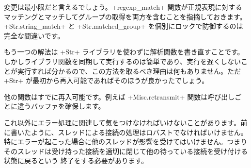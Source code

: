 変更は最小限だと言えるでしょう。\ml+regexp_match+ 関数が正規表現に対するマッチングとマッチしてグループの取得を両方を含むことを指摘しておきます。\ml+Str.string_match+ と \ml+Str.matched_group+ を個別にロックで防御するのは完全な間違いです。

もう一つの解法は \ml+Str+ ライブラリを使わずに解析関数を書き直すことです。しかしライブラリ関数を同期して実行するのは簡単であり、実行を遅くしないことが実行すれば分かるので、この方法を取るべき理由は何もありません。ただ \ml+Str+ が最初から再入可能であればそのほうが良かったでしょう。

他の関数はすでに再入可能です。例えば \ml+Misc.retransmit+ 関数は呼び出しごとに違うバッファを確保します。

これ以外にエラー処理に関連して気をつけなければいけないことがあります。前に書いたように、スレッドによる接続の処理はロバストでなければいけません。特にエラーが起こった場合に他のスレッドが影響を受けてはいけません。つまりそのスレッドは受け持った接続を適切に閉じて他の待っている接続を受け付ける状態に戻るという  終了をする必要があります。

